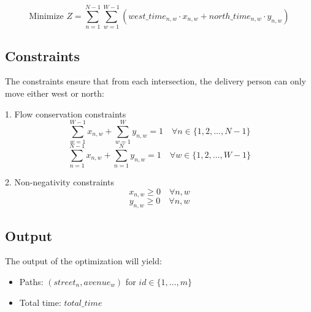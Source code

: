 \documentclass{article}
\begin{document}
\[
\text{Minimize } Z = \sum_{n=1}^{N-1} \sum_{w=1}^{W-1} (west\_time_{n,w} \cdot x_{n,w} + north\_time_{n,w} \cdot y_{n,w})
\]

\subsection*{Constraints}

The constraints ensure that from each intersection, the delivery person can only move either west or north:

1. Flow conservation constraints
   \[
   \sum_{w=1}^{W-1} x_{n,w} + \sum_{w=1}^{W} y_{n,w} = 1 \quad \forall n \in \{1, 2, \ldots, N-1\}
   \]
   \[
   \sum_{n=1}^{N-1} x_{n,w} + \sum_{n=1}^{N} y_{n,w} = 1 \quad \forall w \in \{1, 2, \ldots, W-1\}
   \]

2. Non-negativity constraints
   \[
   x_{n,w} \geq 0 \quad \forall n, w
   \]
   \[
   y_{n,w} \geq 0 \quad \forall n, w
   \]

\subsection*{Output}

The output of the optimization will yield:
\begin{itemize}
    \item Paths: \((street_{n}, avenue_{w})\) for \(id \in \{1, \ldots, m\}\)
    \item Total time: \(total\_time\)
\end{itemize}
\end{document}
